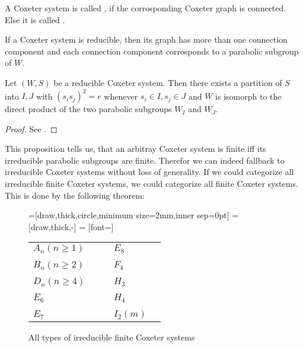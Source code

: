 \begin{defi}
	A Coxeter system is called , if the corrosponding Coxeter graph is connected. Else it is called .
\end{defi}

If a Coxeter system is reducible, then its graph has more than one connection component and each connection component corrosponds to a parabolic subgroup of $W$. 

\begin{prop}
	Let $(W,S)$ be a reducible Coxeter system. Then there exists a partition of $S$ into $I,J$ with $(s_i s_j)^2 = e$ whenever $s_i \in I, s_j \in J$ and $W$ is isomorph to the direct product of the two parabolic subgroups $W_I$ and $W_J$.

	\begin{proof}
		See \cite[Proposition 6.1]{humphreys:coxeter}.
	\end{proof}
\end{prop}

This proposition tells us, that an arbitray Coxeter system is finite iff its irreducible parabolic subgroups are finite. Therefor we can indeed fallback to irreducible Coxeter systems without loss of generality. If we could categorize all irreducible finite Coxeter systems, we could categorize all finite Coxeter systems. This is done by the following theorem:

\begin{figure}
	\centering
	=[draw,thick,circle,minimum size=2mm,inner sep=0pt]
	 = [draw,thick,-]
	 = [font=\small]

	\begin{tabular}{MMcMM}
	$A_n (n \geq 1)$
	&
	\An
	&
	\hspace*{\cgpadh}
	&
	$E_8$
	&
	\Eeight
	\\
	\vspace*{\cgpadv}
	\\
	$B_n (n \geq 2)$
	&
	\Bn
	&
	\hspace*{\cgpadh}
	&
	$F_4$
	&
	\Ffour
	\\
	\vspace*{\cgpadv}
	\\
	$D_n (n \geq 4)$
	&
	\Dn
	&
	\hspace*{\cgpadh}
	&
	$H_3$
	&
	\Hthree
	\\
	\vspace*{\cgpadv}
	\\
	$E_6$
	&
	\Esix
	&
	\hspace*{\cgpadh}
	&
	$H_4$
	&
	\Hfour
	\\
	\vspace*{\cgpadv}
	\\
	$E_7$
	&
	\Eseven
	&
	\hspace*{\cgpadh}
	&
	$I_2(m)$
	&
	\Itwom
	\end{tabular}
	\caption{All types of irreducible finite Coxeter systems}
	\label{fig:finite-coxeter-systems}
\end{figure}

